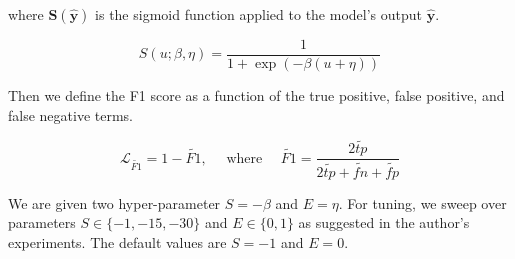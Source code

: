where $\mathbf{S}(\hat{\mathbf{y}})$ is the sigmoid function applied to the model's output $\hat{\mathbf{y}}$.

\begin{equation}
  S(u ; \beta, \eta)=\frac{1}{1+\exp (-\beta(u+\eta))}
\end{equation}

Then we define the F1 score as a function of the true positive, false positive, and false negative terms.

\begin{equation}
  \mathcal{L}_{\widetilde{F 1}}=1-\widetilde{F 1}, \quad \text { where } \quad \widetilde{F 1}=\frac{2 \widetilde{t p}}{2 \widetilde{t p}+\widetilde{f n}+\widetilde{f p}}
\end{equation}

We are given two hyper-parameter $S=-\beta$ and $E=\eta$.
For tuning, we sweep over parameters $S \in \{-1, -15, -30\}$ and $E \in \{0, 1\}$ as suggested in the author's experiments.
The default values are $S=-1$ and $E=0$.



